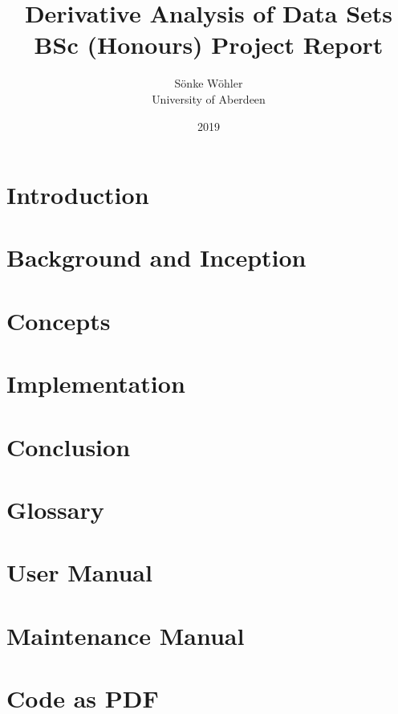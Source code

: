 \documentclass[11pt]{report}
\title{  Derivative Analysis of Data Sets \\
  \large BSc (Honours) Project Report
}
\author{S\"onke W\"ohler  \\
  University of Aberdeen }
\date{2019}
\begin{document}
  
  
  
  
  
  \tableofcontents
  
  \chapter{Introduction}
  \label{cha:intro}
  
    
  
  \chapter{Background and Inception}
  \label{cha:background}
  
    
  
  \chapter{Concepts}
  \label{cha:concepts}
  
    
  
  \chapter{Implementation}
  \label{cha:impl}
  
    
    
  \chapter{Conclusion}
  \label{cha:conc}
  
    
  
  \chapter{Glossary}
  \label{cha:glossary}
  
    
  
  \chapter{User Manual}
  \label{cha:user}
    
    
  
  \chapter{Maintenance Manual}
  \label{cha:maint}
  
    
  
  \chapter{Code as PDF}
  \label{cha:code}
    
  
  \clearpage
  \nocite{*} %
  
  
\end{document}
